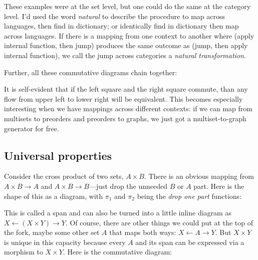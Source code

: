\documentclass[11pt]{article}
\begin{document}
These examples were at the set level, but one could do the same at the category level.
I'd used the word {\em natural} to describe the procedure to map across languages,
then find in dictionary; or identically find in dictionary then map across languages.
If there is a mapping from one context to another where (apply internal function,
then jump) produces the same outcome as (jump, then apply internal function), we call
the jump across categories a {\em natural transformation}.

Further, all these commutative diagrams chain together:


It is self-evident that if the left square and the right square commute, than any flow
from upper left to lower right will be equivalent. This becomes especially interesting
when we have mappings across different contexts: if we can map from multisets to preorders
and preorders to graphs, we just got a multiset-to-graph generator for free.

\subsection{Universal properties}
Consider the cross product of two sets, $A\times B$. There is an obvious mapping from
$A\times B \to A$ and $A\times B \to B$---just drop the unneeded $B$ or $A$ part. Here
is the shape of this as a diagram, with $\pi_1$ and $\pi_2$ being the {\em drop one
part} functions:


This is called a span and can also be turned into a little inline diagram as
$X \leftarrow (X\times Y) \rightarrow Y$.
Of course, there are other things we could put at the top of the fork, maybe some other
set $A$ that maps both ways: $X \leftarrow A \rightarrow Y$.
But $X\times Y$ is unique in this capacity because every $A$ and its span can be expressed
via a morphism to $X\times Y$. Here is the commutative diagram:

\end{document}
